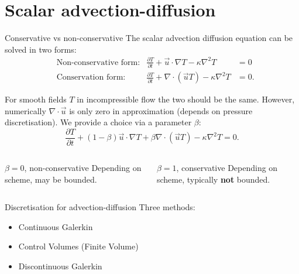 \documentclass[12pt]{beamer}
\newcommand\pp[2]{\frac{\partial #1}{\partial #2}}
\newcommand\ppt[1]{\pp{#1}t}
\newcommand\grad\nabla
\renewcommand\div{\nabla\cdot}
\renewcommand\emph[1]{{\bf #1}}
\begin{document}
\section{Scalar advection-diffusion}
\begin{frame}{Conservative vs non-conservative}
  \small
  The scalar advection diffusion equation can be solved in two
  forms:
  \begin{align*}
    &\text{Non-conservative form:} &
    \ppt T + \vec u\cdot\grad T - \kappa \nabla^2 T &= 0 \\
    &\text{Conservation form:} &
    \ppt T + \div \left(\vec u T\right) - \kappa \nabla^2 T &= 0.
  \end{align*}

  For smooth fields $T$ in incompressible flow the two should be the same. However, numerically
  $\div\vec u$ is only zero in approximation (depends on pressure
  discretisation). We provide a choice via a
  parameter $\beta$:
  \begin{equation*}
    \ppt T + (1-\beta)\vec u\cdot\grad T + \beta \div \left( \vec u T\right)- \kappa \nabla^2 T = 0.
  \end{equation*}

  \vspace{-0.5em}
  \begin{columns}
    \begin{column}{0.5\textwidth}
      \begin{block}{$\beta=0$, non-conservative}
        Depending on scheme, may be bounded.
      \end{block}
    \end{column}%
    \begin{column}{0.5\textwidth}
      \begin{block}{$\beta=1$, conservative}
        Depending on scheme,
        typically \emph{not} bounded.
      \end{block}
    \end{column}
  \end{columns}
\end{frame}

\begin{frame}{Discretisation for advection-diffusion}
  Three methods:
  \begin{itemize}
    \item Continuous Galerkin
    \item Control Volumes (Finite Volume)
    \item Discontinuous Galerkin
  \end{itemize}
\end{frame}
\end{document}
